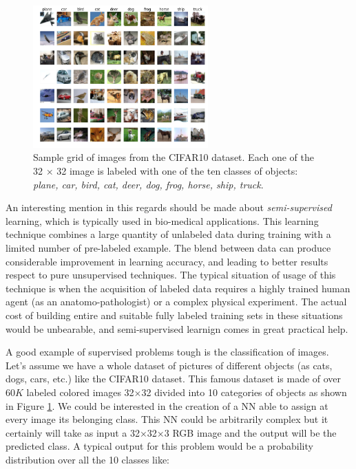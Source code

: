 \documentclass[12pt,a4paper]{report}
\begin{document}
\begin{figure}
    \centering
    \includegraphics[width = 0.6\textwidth]{images/cifar10}
    \caption{Sample grid of images from the CIFAR10 dataset. Each one of the 32 $\times$ 32 image is labeled with one of the ten classes of objects: \textit{plane, car, bird, cat, deer, dog, frog, horse, ship, truck}.}
    \label{fig:cf10}
\end{figure}

An interesting mention in this regards should be made about \textit{semi-supervised} learning, which is typically used in bio-medical applications. This learning technique combines a large quantity of unlabeled data during training with a limited number of pre-labeled example. The blend between data can produce considerable improvement in learning accuracy, and leading to better results respect to pure unsupervised techniques. The typical situation of usage of this technique is when the acquisition of labeled data requires a highly trained human agent (as an anatomo-pathologist) or a complex physical experiment. The actual cost of building entire and suitable fully labeled training sets in these situations would be unbearable, and semi-supervised learnign comes in great practical help.

A good example of supervised problems tough is the classification of images. Let's assume we have a whole dataset of pictures of different objects (as cats, dogs, cars, etc.) like the CIFAR10 \cite{cifar10} dataset. This famous dataset is made of over 60$K$ labeled colored images 32$\times$32 divided into 10 categories of objects as shown in Figure \ref{fig:cf10}. We could be interested in the creation of a NN able to assign at every image its belonging class. This NN could be arbitrarily complex but it certainly will take as input a 32$\times$32$\times$3 RGB image and the output will be the predicted class. A typical output for this problem would be a probability distribution over all the 10 classes like:
\end{document}
